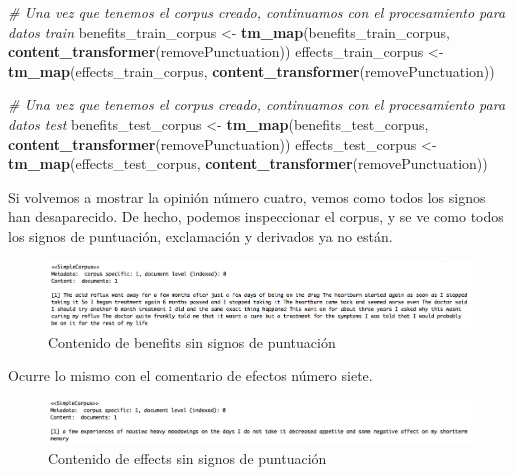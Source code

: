 \documentclass[spanish,]{article}
\newenvironment{Shaded}{\begin{snugshade}}{\end{snugshade}}
\newcommand{\KeywordTok}[1]{\textcolor[rgb]{0.13,0.29,0.53}{\textbf{#1}}}
\newcommand{\StringTok}[1]{\textcolor[rgb]{0.31,0.60,0.02}{#1}}
\newcommand{\CommentTok}[1]{\textcolor[rgb]{0.56,0.35,0.01}{\textit{#1}}}
\newcommand{\NormalTok}[1]{#1}
\begin{document}
\begin{Shaded}
\begin{Highlighting}[]
\CommentTok{# Una vez que tenemos el corpus creado, continuamos con el procesamiento para datos train}
\NormalTok{benefits_train_corpus <-}\StringTok{ }\KeywordTok{tm_map}\NormalTok{(benefits_train_corpus,}
                                \KeywordTok{content_transformer}\NormalTok{(removePunctuation))}
\NormalTok{effects_train_corpus <-}\StringTok{ }\KeywordTok{tm_map}\NormalTok{(effects_train_corpus, }
                               \KeywordTok{content_transformer}\NormalTok{(removePunctuation))}

\CommentTok{# Una vez que tenemos el corpus creado, continuamos con el procesamiento para datos test}
\NormalTok{benefits_test_corpus <-}\StringTok{ }\KeywordTok{tm_map}\NormalTok{(benefits_test_corpus, }
                               \KeywordTok{content_transformer}\NormalTok{(removePunctuation))}
\NormalTok{effects_test_corpus <-}\StringTok{ }\KeywordTok{tm_map}\NormalTok{(effects_test_corpus, }
                              \KeywordTok{content_transformer}\NormalTok{(removePunctuation))}
\end{Highlighting}
\end{Shaded}

Si volvemos a mostrar la opinión número cuatro, vemos como todos los
signos han desaparecido. De hecho, podemos inspeccionar el corpus, y se
ve como todos los signos de puntuación, exclamación y derivados ya no
están.

\begin{figure}[h]
    \centering
    \includegraphics[width=1\textwidth]{imagenes/benefits_signos_puntuacion.png}
    \caption{Contenido de benefits sin signos de puntuación}
    \label{benefits2}
\end{figure}

Ocurre lo mismo con el comentario de efectos número siete.

\begin{figure}[h]
    \centering
    \includegraphics[width=1\textwidth]{imagenes/effects_signos_puntuacion.png}
    \caption{Contenido de effects sin signos de puntuación}
    \label{benefits2}
\end{figure}
\end{document}
